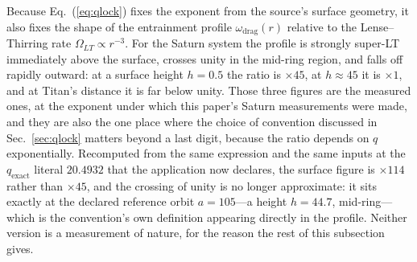 \documentclass[aps,reprint,amsmath,amssymb,nofootinbib,superscriptaddress,floatfix]{revtex4-2}
\begin{document}
Because Eq.~(\ref{eq:qlock}) fixes the exponent from the source's
surface geometry, it also fixes the shape of the entrainment profile
$\omega_{\mathrm{drag}}(r)$ relative to the Lense--Thirring rate
$\Omega_{LT}\propto r^{-3}$.
For the Saturn system the profile is strongly super-LT immediately
above the surface, crosses unity in the mid-ring region, and falls off
rapidly outward: at a surface height $h=0.5$ the ratio is $\times45$,
at $h\approx45$ it is $\times1$, and at Titan's distance it is far
below unity.
Those three figures are the measured ones, at the exponent under which
this paper's Saturn measurements were made, and they are also the one
place where the choice of convention discussed in
Sec.~\ref{sec:qlock} matters beyond a last digit, because the ratio
depends on $q$ exponentially.
Recomputed from the same expression and the same inputs at the
$q_{\mathrm{exact}}$ literal $20.4932$ that the application now
declares, the surface figure is $\times114$ rather than $\times45$,
and the crossing of unity is no longer approximate: it sits exactly at
the declared reference orbit $a=105$---a height $h=44.7$, mid-ring---%
which is the convention's own definition appearing directly in the
profile.
Neither version is a measurement of nature, for the reason the rest of
this subsection gives.
\end{document}
